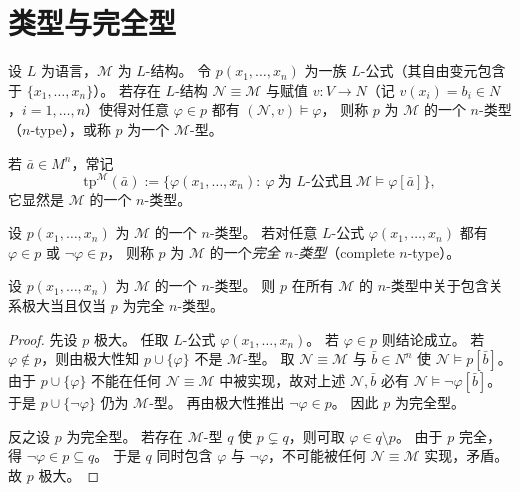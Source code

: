 \documentclass[lang=cn,a4paper,newtx,section]{elegantbook}
\begin{document}
\section{类型与完全型}

\begin{definition}[类型]
\label{type-over-a-structure}
设 $L$ 为语言，$\mathcal M$ 为 $L$-结构。
令 $p(x_1,\dots,x_n)$ 为一族 $L$-公式（其自由变元包含于 $\{x_1,\dots,x_n\}$）。
若存在 $L$-结构 $\mathcal N\equiv\mathcal M$ 与赋值 $v:V\to N$（记 $v(x_i)=b_i\in N$，$i=1,\dots,n$）使得对任意 $\varphi\in p$ 都有 $(\mathcal N,v)\models\varphi$，
则称 $p$ 为 $\mathcal M$ 的一个 $n$-类型（$n$-type），或称 $p$ 为一个 $\mathcal M$-型。
\end{definition}

\begin{remark}
若 $\bar a\in M^n$，常记
\[
  \mathrm{tp}^{\mathcal M}(\bar a):=\{\varphi(x_1,\dots,x_n):\ \varphi\ \text{为 $L$-公式且}\ \mathcal M\models\varphi[\bar a]\},
\]
它显然是 $\mathcal M$ 的一个 $n$-类型。
\end{remark}

\begin{definition}[完全型]
\label{complete-type}
设 $p(x_1,\dots,x_n)$ 为 $\mathcal M$ 的一个 $n$-类型。
若对任意 $L$-公式 $\varphi(x_1,\dots,x_n)$ 都有 $\varphi\in p$ 或 $\neg\varphi\in p$，
则称 $p$ 为 $\mathcal M$ 的一个\emph{完全 $n$-类型}（complete $n$-type）。
\end{definition}

\begin{lemma}
\label{maximal-type-iff-complete}
设 $p(x_1,\dots,x_n)$ 为 $\mathcal M$ 的一个 $n$-类型。
则 $p$ 在所有 $\mathcal M$ 的 $n$-类型中关于包含关系极大当且仅当 $p$ 为完全 $n$-类型。
\end{lemma}

\begin{proof}
先设 $p$ 极大。
任取 $L$-公式 $\varphi(x_1,\dots,x_n)$。
若 $\varphi\in p$ 则结论成立。
若 $\varphi\notin p$，则由极大性知 $p\cup\{\varphi\}$ 不是 $\mathcal M$-型。
取 $\mathcal N\equiv\mathcal M$ 与 $\bar b\in N^n$ 使 $\mathcal N\models p[\bar b]$。
由于 $p\cup\{\varphi\}$ 不能在任何 $\mathcal N\equiv\mathcal M$ 中被实现，故对上述 $\mathcal N,\bar b$ 必有 $\mathcal N\models\neg\varphi[\bar b]$。
于是 $p\cup\{\neg\varphi\}$ 仍为 $\mathcal M$-型。
再由极大性推出 $\neg\varphi\in p$。
因此 $p$ 为完全型。

反之设 $p$ 为完全型。
若存在 $\mathcal M$-型 $q$ 使 $p\subsetneq q$，则可取 $\varphi\in q\setminus p$。
由于 $p$ 完全，得 $\neg\varphi\in p\subseteq q$。
于是 $q$ 同时包含 $\varphi$ 与 $\neg\varphi$，不可能被任何 $\mathcal N\equiv\mathcal M$ 实现，矛盾。
故 $p$ 极大。
\end{proof}
\end{document}
